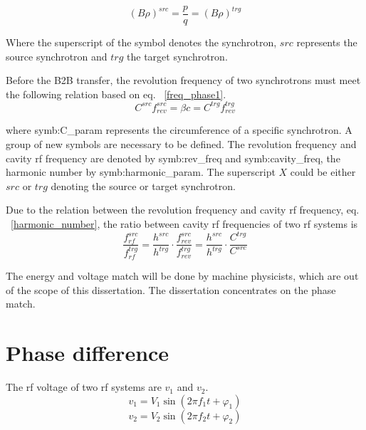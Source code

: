 \begin{equation}
	\label{eq:rigidity}
	(B\rho)^{\mathit{src}} =\frac{p}{q}=(B\rho)^{\mathit{trg}}
\end{equation}

Where the superscript of the symbol denotes the synchrotron, $\mathit{src}$ represents the source synchrotron and $\mathit{trg}$ the target synchrotron. 

Before the B2B transfer, the revolution frequency of two synchrotrons must meet the following relation based on eq. ~\ref{freq_phase1}. 
\begin{equation}
	C^{\mathit{src}}f_{rev}^{\mathit{src}} = \beta c=C^{\mathit{trg}}f_{rev}^{\mathit{trg}}
\end{equation}

where \gls{symb:C_param} represents the circumference of a specific synchrotron. A group of new symbols are necessary to be defined. The revolution frequency and cavity rf frequency are denoted by \gls{symb:rev_freq} and \gls{symb:cavity_freq}, the harmonic number by \gls{symb:harmonic_param}. The superscript $X$ could be either $src$ or $trg$ denoting the source or target synchrotron. 

Due to the relation between the revolution frequency and cavity rf frequency, eq. ~\ref{harmonic_number}, the ratio between cavity rf frequencies of two rf systems is
\begin{equation}
	\frac{f_{rf}^{\mathit{src}}}{f_{rf}^{\mathit{trg}}}=\frac{h^{\mathit{src}}}{h^{\mathit{trg}}}\cdot\frac{f_{rev}^{\mathit{src}}}{f_{rev}^{\mathit{trg}}}=\frac{h^{\mathit{src}}}{h^{\mathit{trg}}}\cdot \frac{C^{\mathit{trg}}}{C^{\mathit{src}}}
\end{equation}

The energy and voltage match will be done by machine physicists, which are out of the scope of this dissertation. The dissertation concentrates on the phase match.
\section{Phase difference}
\label{match}
The rf voltage of two rf systems are $v_1$ and $v_2$.
\begin{equation}
\label{rf_freq1}
	v_1=V_1\sin(2\pi f_1t+\varphi_1)
\end{equation}
\begin{equation}
\label{rf_freq2}
	v_2=V_2\sin(2\pi f_2t+\varphi_2)
\end{equation}

